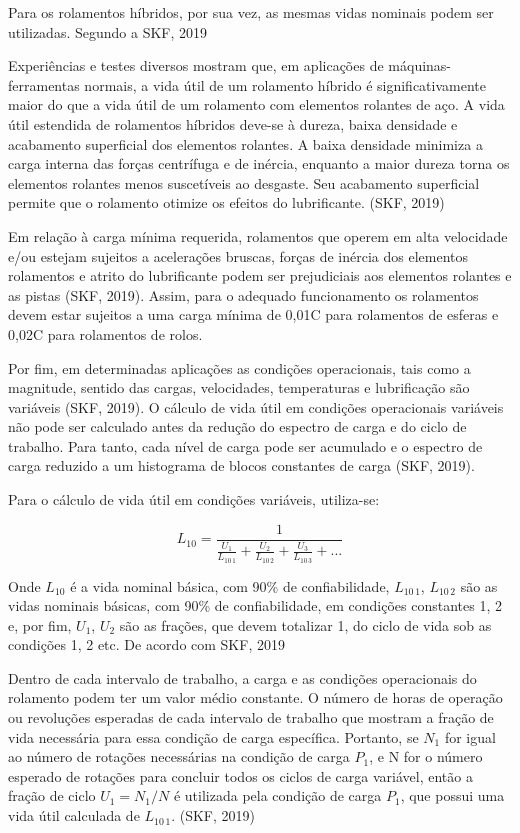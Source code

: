 \documentclass[
	12pt,				
	oneside,			
	a4paper,			
	english,			
	brazil				
	]{abntex2ppgsi}
\begin{document}
Para os rolamentos híbridos, por sua vez, as mesmas vidas nominais podem ser utilizadas. Segundo a SKF, 2019

\begin{citacao}
Experiências e testes diversos mostram que, em aplicações de máquinas-ferramentas normais, a vida útil de um rolamento híbrido é significativamente maior do que a vida útil de um rolamento com elementos rolantes de aço. A vida útil estendida de rolamentos híbridos deve-se à dureza, baixa densidade e acabamento superficial dos elementos rolantes. A baixa densidade minimiza a carga interna das forças centrífuga e de inércia, enquanto a maior dureza torna os elementos rolantes menos suscetíveis ao desgaste. Seu acabamento superficial permite que o rolamento otimize os efeitos do lubrificante. (SKF, 2019)
\end{citacao}

Em relação à carga mínima requerida, rolamentos que operem em alta velocidade e/ou estejam sujeitos a acelerações bruscas, forças de inércia dos elementos rolamentos e atrito do lubrificante podem ser prejudiciais aos elementos rolantes e as pistas (SKF, 2019). Assim, para o adequado funcionamento os rolamentos devem estar sujeitos a uma carga mínima de 0,01C para rolamentos de esferas e 0,02C para rolamentos de rolos. 

Por fim, em determinadas aplicações as condições operacionais, tais como a magnitude, sentido das cargas, velocidades, temperaturas e lubrificação são variáveis (SKF, 2019). O cálculo de vida útil em condições operacionais variáveis não pode ser calculado antes da redução do espectro de carga e do ciclo de trabalho. Para tanto, cada nível de carga pode ser acumulado e o espectro de carga reduzido a um histograma de blocos constantes de carga (SKF, 2019).

Para o cálculo de vida útil em condições variáveis, utiliza-se:

\[L_{10}= \frac{1}{ \frac{U_{1}}{L_{10 \,1}} + \frac{U_{2}}{L_{10 \,2}} + \frac{U_{3}}{L_{10 \,3}} + ...}\]

Onde $L_{10}$ é a vida nominal básica, com 90\% de confiabilidade, $L_{10 \,1}$, $L_{10 \,2}$ são as vidas nominais básicas, com 90\% de confiabilidade, em condições constantes 1, 2 e, por fim, $U_{1}$, $U_{2}$ são as frações, que devem totalizar 1, do ciclo de vida sob as condições 1, 2 etc. De acordo com SKF, 2019

\begin{citacao}
Dentro de cada intervalo de trabalho, a carga e as condições operacionais do rolamento podem ter um valor médio constante. O número de horas de operação ou revoluções esperadas de cada intervalo de trabalho que mostram a fração de vida necessária para essa condição de carga específica. Portanto, se ${N_{1}}$ for igual ao número de rotações necessárias na condição de carga ${P_{1}}$, e N for o número esperado de rotações para concluir todos os ciclos de carga variável, então a fração de ciclo ${U_{1} = N_{1} / N}$ é utilizada pela condição de carga ${P_{1}}$, que possui uma vida útil calculada de ${L_{10 \,1}}$. (SKF, 2019)
\end{citacao}
\end{document}
